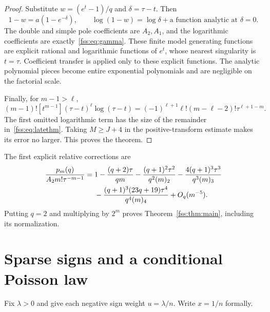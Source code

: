 \documentclass[11pt]{article}
\newcommand{\fall}[2]{(#1)_{#2}}
\begin{document}
\begin{proof}
Substitute $w=(e^t-1)/q$ and $\delta=\tau-t$. Then
\[
 1-w=a(1-e^{-\delta}),\qquad
 \log(1-w)=\log\delta+\text{a function analytic at }\delta=0.
\]
The double and simple pole coefficients are $A_2,A_1$, and the logarithmic coefficients are exactly~\eqref{fss:eq:gamma}. These finite model generating functions are explicit rational and logarithmic functions of $e^t$, whose nearest singularity is $t=\tau$. Coefficient transfer is applied only to these explicit functions. The analytic polynomial pieces become entire exponential polynomials and are negligible on the factorial scale.

Finally, for $m-1>\ell$,
\begin{equation}\label{fss:eq:logtransfer}
 (m-1)![t^{m-1}](\tau-t)^\ell\log(\tau-t)
 =(-1)^{\ell+1}\ell!(m-\ell-2)!\tau^{\ell+1-m}.
\end{equation}
The first omitted logarithmic term has the size of the remainder in~\eqref{fss:eq:latethm}. Taking $M\ge J+4$ in the positive-transform estimate makes its error no larger. This proves the theorem.
\end{proof}

The first explicit relative corrections are
\begin{align}\label{fss:eq:generallate}
 \frac{p_m(q)}{A_2m!\tau^{-m-1}}={}&1-\frac{(q+2)\tau}{qm}
 -\frac{(q+1)^2\tau^2}{q^2\fall m2}
 -\frac{4(q+1)^3\tau^3}{q^3\fall m3}\notag\\
 &-\frac{(q+1)^3(23q+19)\tau^4}{q^4\fall m4}
 +O_q(m^{-5}).
\end{align}
Putting $q=2$ and multiplying by $2^m$ proves Theorem~\ref{fss:thm:main}, including its normalization.

\section{Sparse signs and a conditional Poisson law}\label{fss:sec:sparse}
Fix $\lambda>0$ and give each negative sign weight $u=\lambda/n$. Write $x=1/n$ formally.
\end{document}
